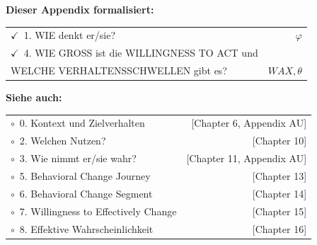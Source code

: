 \begin{tcolorbox}[
  title={\textbf{Die 9 Fragen des EBF — Appendix AV Formalisierung}},
  colback=green!3,
  colframe=green!40!black,
  fonttitle=\bfseries\sffamily,
  coltitle=white,
  boxrule=0.8pt,
  arc=2mm
]
\small\sffamily
\textbf{Dieser Appendix formalisiert:}\\[4pt]
\begin{tabular}{@{}p{}r@{}}
$\checkmark$~1. WIE denkt er/sie? & $\varphi$ \\
$\checkmark$~4. WIE GROSS ist die WILLINGNESS TO ACT und & \\
\quad WELCHE VERHALTENSSCHWELLEN gibt es? & $WAX, \theta$ \\
\end{tabular}

\vspace{6pt}
\textbf{Siehe auch:}\\[4pt]
\begin{tabular}{@{}p{}r@{}}
$\circ$~0. Kontext und Zielverhalten & [Chapter 6, Appendix AU] \\
$\circ$~2. Welchen Nutzen? & [Chapter 10] \\
$\circ$~3. Wie nimmt er/sie wahr? & [Chapter 11, Appendix AU] \\
$\circ$~5. Behavioral Change Journey & [Chapter 13] \\
$\circ$~6. Behavioral Change Segment & [Chapter 14] \\
$\circ$~7. Willingness to Effectively Change & [Chapter 15] \\
$\circ$~8. Effektive Wahrscheinlichkeit & [Chapter 16] \\
\end{tabular}
\end{tcolorbox}


